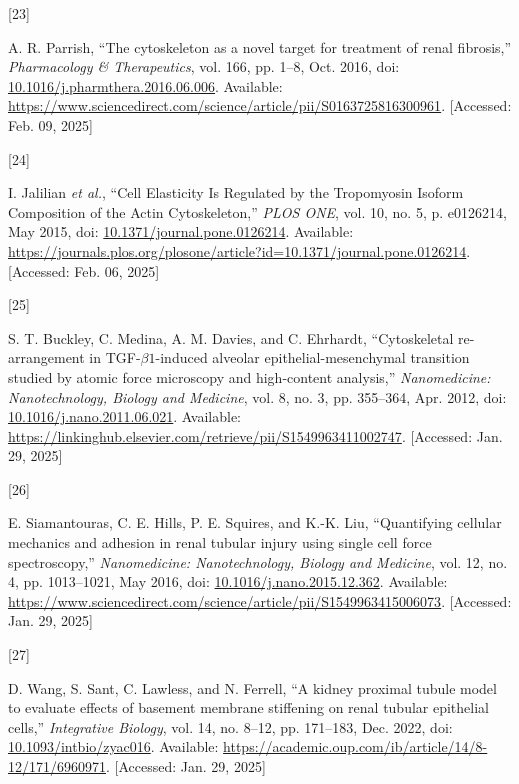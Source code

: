 \documentclass[
  paper=a4,
  ,captions=tableheading
]{scrartcl}
\newlength{\cslhangindent}
\newlength{\csllabelwidth}
\newenvironment{CSLReferences}[2] %
  {\begin{list}{}{%
   \setlength{\itemindent}{0pt}
   \setlength{\leftmargin}{0pt}
   \setlength{\parsep}{0pt}
   \ifodd #1
    \setlength{\leftmargin}{\cslhangindent}
    \setlength{\itemindent}{-1\cslhangindent}
   \fi
   \setlength{\itemsep}{#2\baselineskip}}}
  {\end{list}}
\newcommand{\CSLLeftMargin}[1]{\parbox[t]{\csllabelwidth}{\strut#1\strut}}
\newcommand{\CSLRightInline}[1]{\parbox[t]{\linewidth - \csllabelwidth}{\strut#1\strut}}
\begin{document}
\begin{CSLReferences}{0}{0}
\CSLLeftMargin{{[}23{]} }%
\CSLRightInline{A. R. Parrish, {``The cytoskeleton as a novel target for
treatment of renal fibrosis,''} \emph{Pharmacology \& Therapeutics},
vol. 166, pp. 1--8, Oct. 2016, doi:
\href{https://doi.org/10.1016/j.pharmthera.2016.06.006}{10.1016/j.pharmthera.2016.06.006}.
Available:
\url{https://www.sciencedirect.com/science/article/pii/S0163725816300961}.
{[}Accessed: Feb. 09, 2025{]}}

\CSLLeftMargin{{[}24{]} }%
\CSLRightInline{I. Jalilian \emph{et al.}, {``Cell {Elasticity Is
Regulated} by the {Tropomyosin Isoform Composition} of the {Actin
Cytoskeleton},''} \emph{PLOS ONE}, vol. 10, no. 5, p. e0126214, May
2015, doi:
\href{https://doi.org/10.1371/journal.pone.0126214}{10.1371/journal.pone.0126214}.
Available:
\url{https://journals.plos.org/plosone/article?id=10.1371/journal.pone.0126214}.
{[}Accessed: Feb. 06, 2025{]}}

\CSLLeftMargin{{[}25{]} }%
\CSLRightInline{S. T. Buckley, C. Medina, A. M. Davies, and C. Ehrhardt,
{``Cytoskeletal re-arrangement in {TGF-\(\beta 1\)-induced} alveolar
epithelial-mesenchymal transition studied by atomic force microscopy and
high-content analysis,''} \emph{Nanomedicine: Nanotechnology, Biology
and Medicine}, vol. 8, no. 3, pp. 355--364, Apr. 2012, doi:
\href{https://doi.org/10.1016/j.nano.2011.06.021}{10.1016/j.nano.2011.06.021}.
Available:
\url{https://linkinghub.elsevier.com/retrieve/pii/S1549963411002747}.
{[}Accessed: Jan. 29, 2025{]}}

\CSLLeftMargin{{[}26{]} }%
\CSLRightInline{E. Siamantouras, C. E. Hills, P. E. Squires, and K.-K.
Liu, {``Quantifying cellular mechanics and adhesion in renal tubular
injury using single cell force spectroscopy,''} \emph{Nanomedicine:
Nanotechnology, Biology and Medicine}, vol. 12, no. 4, pp. 1013--1021,
May 2016, doi:
\href{https://doi.org/10.1016/j.nano.2015.12.362}{10.1016/j.nano.2015.12.362}.
Available:
\url{https://www.sciencedirect.com/science/article/pii/S1549963415006073}.
{[}Accessed: Jan. 29, 2025{]}}

\CSLLeftMargin{{[}27{]} }%
\CSLRightInline{D. Wang, S. Sant, C. Lawless, and N. Ferrell, {``A
kidney proximal tubule model to evaluate effects of basement membrane
stiffening on renal tubular epithelial cells,''} \emph{Integrative
Biology}, vol. 14, no. 8--12, pp. 171--183, Dec. 2022, doi:
\href{https://doi.org/10.1093/intbio/zyac016}{10.1093/intbio/zyac016}.
Available:
\url{https://academic.oup.com/ib/article/14/8-12/171/6960971}.
{[}Accessed: Jan. 29, 2025{]}}


\end{CSLReferences}
\end{document}
